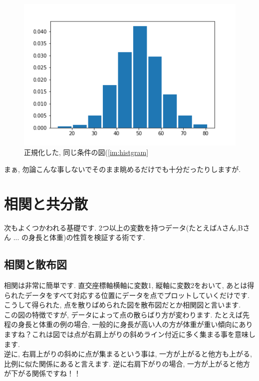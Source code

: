 \documentclass[11pt,a4paper]{jreport}
\begin{document}
\begin{figure}[H]
\label{im:z-hist}
  \centering
  \includegraphics[width=120mm,bb=0 0 432 288]{figures/z-hist.png}
  \caption{正規化した, 同じ条件の図(\ref{im:histgram}}
\end{figure}

まぁ, 勿論こんな事しないでそのまま眺めるだけでも十分だったりしますが.

\section{相関と共分散}
次もよくつかわれる基礎です. 2つ以上の変数を持つデータ(たとえばAさん,Bさん ... の身長と体重)の性質を検証する術です. \\
\subsection{相関と散布図}
相関は非常に簡単です. 直交座標軸横軸に変数1, 縦軸に変数2をおいて, あとは得られたデータをすべて対応する位置にデータを点でプロットしていくだけです. こうして得られた, 点を散りばめられた図を散布図だとか相関図と言います.\\
この図の特徴ですが, データによって点の散らばり方が変わります. たとえば先程の身長と体重の例の場合, 一般的に身長が高い人の方が体重が重い傾向にありますね？これは図では点が右肩上がりの斜めライン付近に多く集まる事を意味します. \\
逆に, 右肩上がりの斜めに点が集まるという事は, 一方が上がると他方も上がる, 比例に似た関係にあると言えます. 逆に右肩下がりの場合, 一方が上がると他方が下がる関係ですね！！\\
\end{document}
